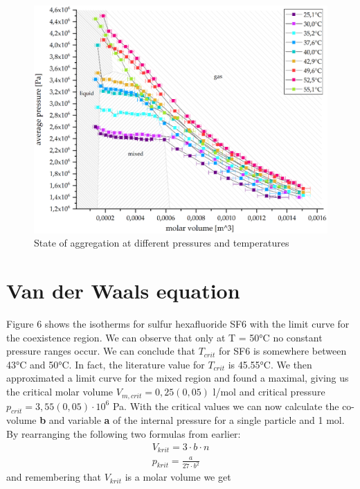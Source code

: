 \documentclass[10pt,a4paper]{article}
\begin{document}
\begin{figure}[hbt!]
\includegraphics[width=400pt, center]{isobaresArea.eps}
\caption{State of aggregation at different pressures and temperatures}
\label{fig:length_eight_mouse}
\end{figure}


\section{Van der Waals equation}


Figure 6 shows the isotherms for sulfur hexafluoride SF6 with the limit curve for the coexistence region. We can observe that only at T = 50°C no constant pressure ranges occur. We can
conclude that $T_{crit}$ for SF6 is somewhere between 43°C and 50°C. In fact, the literature value for $T_{crit}$ is 45.55°C.\cite{messerDataSheet}
We then approximated a limit curve for the mixed region and found a maximal, giving us the critical molar volume $V_{m,crit} = 0,25(0,05)$ l/mol and critical pressure $p_{crit} = 3,55(0,05) \cdot 10^6 $ Pa.
With the critical values we can now calculate the co-volume \textbf {b} and variable \textbf{a} of the internal pressure for a single particle and 1 mol. By rearranging the following two formulas from earlier:
\begin{align*}
 V_{krit} = 3 \cdot b \cdot n \\
 p_{krit} = \frac{a}{27 \cdot b^2}
\end{align*}
and remembering that $V_{krit}$ is a molar volume we get
\end{document}
